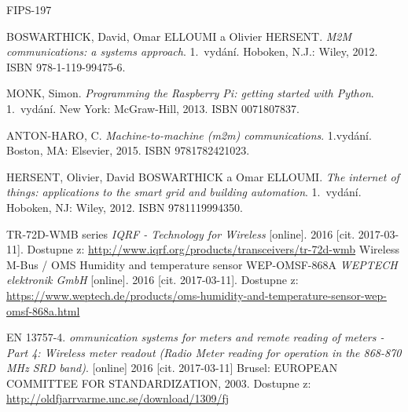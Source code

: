 \begin{literatura}{99}
 \colorbox[rgb]{1,0,0}{FIPS-197}

 BOSWARTHICK, David, Omar ELLOUMI a Olivier HERSENT. \textit{M2M communications: a systems approach}. 1.~vydání. Hoboken, N.J.: Wiley, 2012. ISBN 978-1-119-99475-6.

 MONK, Simon. \textit{Programming the Raspberry Pi: getting started with Python}. 1.~vydání. New York: McGraw-Hill, 2013. ISBN 0071807837.
	
 ANTON-HARO, C. \textit{Machine-to-machine (m2m) communications}. 1.vydání. Boston, MA: Elsevier, 2015. ISBN 9781782421023.	

 HERSENT, Olivier, David BOSWARTHICK a Omar ELLOUMI. \textit{The internet of things: applications to the smart grid and building automation}. 1.~vydání. Hoboken, NJ: Wiley, 2012. ISBN 9781119994350.





				












	 TR-72D-WMB series \textit{IQRF - Technology for Wireless} [online]. 2016 [cit. 2017-03-11]. Dostupne z: \url{http://www.iqrf.org/products/transceivers/tr-72d-wmb}
	 Wireless M-Bus / OMS Humidity and temperature sensor WEP-OMSF-868A \textit{WEPTECH elektronik GmbH} [online]. 2016 [cit. 2017-03-11]. Dostupne z: \url{https://www.weptech.de/products/oms-humidity-and-temperature-sensor-wep-omsf-868a.html}
	
	
	 EN 13757-4. \textit{ommunication systems for meters and remote reading of meters - Part 4: Wireless meter readout (Radio Meter reading for operation in the 868-870 MHz SRD band)}. [online] 2016 [cit. 2017-03-11] Brusel: EUROPEAN COMMITTEE FOR STANDARDIZATION, 2003. Dostupne z: \url{http://oldfjarrvarme.unc.se/download/1309/fj}


\end{literatura}

